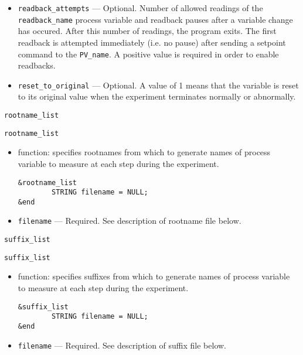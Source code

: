 \begin{itemize}
\begin{itemize}
\begin{itemize}
   \item {\verb+readback_attempts+} --- Optional. Number of allowed
       readings of the {\verb+readback_name+} process variable and
       readback pauses after a variable change has occured.  After
       this number of readings, the program exits.  The first readback
       is attempted immediately (i.e. no pause) after sending a
       setpoint command to the {\verb+PV_name+}.  A positive value is
       required in order to enable readbacks.

   \item {\verb+reset_to_original+} --- Optional. A value of 1 means
       that the variable is reset to its original value when the
       experiment terminates normally or abnormally.
\end{itemize}


\begin{latexonly}
\newpage\begin{center}{\Large \verb+rootname_list+}\end{center}
\end{latexonly}
\begin{htmlonly}
\item {\Large \verb+rootname_list+}
\end{htmlonly}

\begin{itemize}
   \item function: specifies rootnames from which to generate names of process variable to measure at each step during the experiment.
\begin{verbatim}
&rootname_list
        STRING filename = NULL;
&end
\end{verbatim}
   \item {\verb+filename+} --- Required. See description of rootname file below.
\end{itemize}

\begin{latexonly}
\begin{center}{\Large \verb+suffix_list+}\end{center}
\end{latexonly}
\begin{htmlonly}
\item {\Large \verb+suffix_list+}
\end{htmlonly}
\begin{itemize}
   \item function: specifies suffixes from which to generate names of process variable to measure at each step during the experiment.
\begin{verbatim}
&suffix_list
        STRING filename = NULL;
&end
\end{verbatim}
   \item {\verb+filename+} --- Required. See description of suffix file below.
\end{itemize}


\end{itemize}
\end{itemize}
